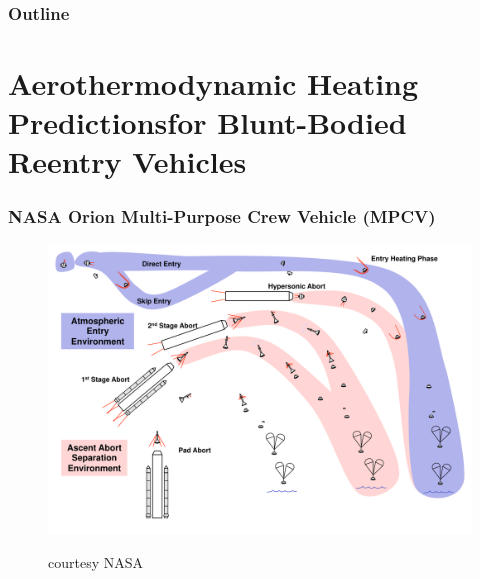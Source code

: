 \documentclass[mathserif]{beamer}
\begin{document}
\begin{frame}[noframenumbering]
    \frametitle{Outline}
    \tableofcontents
\end{frame}

\section[Introduction]{Aerothermodynamic Heating Predictions\newline{}for Blunt-Bodied Reentry Vehicles}


\begin{frame}
\frametitle{NASA Orion Multi-Purpose Crew Vehicle (MPCV)}
\begin{figure}[h]
  \includegraphics[width=\textwidth]{ResponsibleFlightRegimes_Raster}
  \vspace{-3em}
  \small
  \begin{flushright}
    courtesy NASA
  \end{flushright}
\end{figure}
\end{frame}
\end{document}
